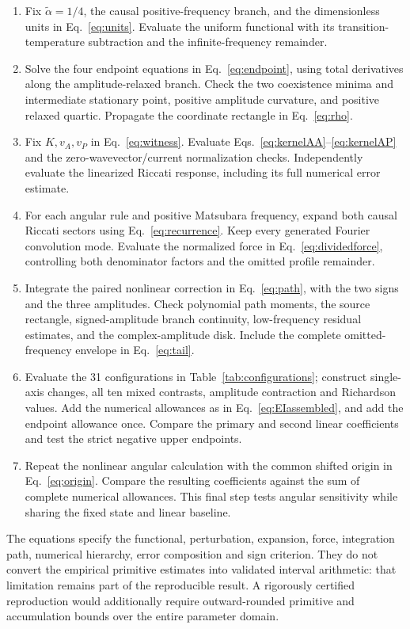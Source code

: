 \begin{enumerate}
\item Fix $\widetilde\alpha=1/4$, the causal positive-frequency branch, and the dimensionless units in Eq.~\eqref{eq:units}. Evaluate the uniform functional with its transition-temperature subtraction and the infinite-frequency remainder.
\item Solve the four endpoint equations in Eq.~\eqref{eq:endpoint}, using total derivatives along the amplitude-relaxed branch. Check the two coexistence minima and intermediate stationary point, positive amplitude curvature, and positive relaxed quartic. Propagate the coordinate rectangle in Eq.~\eqref{eq:rho}.
\item Fix $K,v_A,v_P$ in Eq.~\eqref{eq:witness}. Evaluate Eqs.~\eqref{eq:kernelAA}--\eqref{eq:kernelAP} and the zero-wavevector/current normalization checks. Independently evaluate the linearized Riccati response, including its full numerical error estimate.
\item For each angular rule and positive Matsubara frequency, expand both causal Riccati sectors using Eq.~\eqref{eq:recurrence}. Keep every generated Fourier convolution mode. Evaluate the normalized force in Eq.~\eqref{eq:dividedforce}, controlling both denominator factors and the omitted profile remainder.
\item Integrate the paired nonlinear correction in Eq.~\eqref{eq:path}, with the two signs and the three amplitudes. Check polynomial path moments, the source rectangle, signed-amplitude branch continuity, low-frequency residual estimates, and the complex-amplitude disk. Include the complete omitted-frequency envelope in Eq.~\eqref{eq:tail}.
\item Evaluate the 31 configurations in Table~\ref{tab:configurations}; construct single-axis changes, all ten mixed contrasts, amplitude contraction and Richardson values. Add the numerical allowances as in Eq.~\eqref{eq:EIassembled}, and add the endpoint allowance once. Compare the primary and second linear coefficients and test the strict negative upper endpoints.
\item Repeat the nonlinear angular calculation with the common shifted origin in Eq.~\eqref{eq:origin}. Compare the resulting coefficients against the sum of complete numerical allowances. This final step tests angular sensitivity while sharing the fixed state and linear baseline.
\end{enumerate}

The equations specify the functional, perturbation, expansion, force, integration path, numerical hierarchy, error composition and sign criterion. They do not convert the empirical primitive estimates into validated interval arithmetic: that limitation remains part of the reproducible result. A rigorously certified reproduction would additionally require outward-rounded primitive and accumulation bounds over the entire parameter domain.



